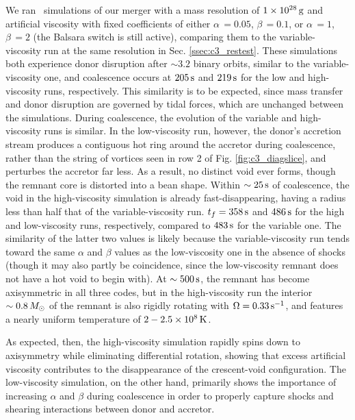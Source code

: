 We ran \gasoline\ simulations of our merger with a mass resolution of $1\times10^{28}\,\mathrm{g}$ and artificial viscosity with fixed coefficients of either $\alpha\,=0.05$, $\beta\,=0.1$, or $\alpha\,=1$, $\beta\,=2$ (the Balsara switch is still active), comparing them to the variable-viscosity run at the same resolution in Sec. \ref{ssec:c3_restest}.  These simulations both experience donor disruption after $\sim3.2$ binary orbits, similar to the variable-viscosity one, and coalescence occurs at $205\,\mathrm{s}$ and $219\,\mathrm{s}$ for the low and high-viscosity runs, respectively.  This similarity is to be expected, since mass transfer and donor disruption are governed by tidal forces, which are unchanged between the simulations.  During coalescence, the evolution of the variable and high-viscosity runs is similar.  In the low-viscosity run, however, the donor's accretion stream produces a contiguous hot ring around the accretor during coalescence, rather than the string of vortices seen in row 2 of Fig. \ref{fig:c3_diagslice}, and perturbes the accretor far less.  As a result, no distinct void ever forms, though the remnant core is distorted into a bean shape.  Within $\sim25\,\mathrm{s}$ of coalescence, the void in the high-viscosity simulation is already fast-disappearing, having a radius less than half that of the variable-viscosity run.  $t_f = 358\,\mathrm{s}$ and $486\,\mathrm{s}$ for the high and low-viscosity runs, respectively, compared to $483\,\mathrm{s}$ for the variable one.  The similarity of the latter two values is likely because the variable-viscosity run tends toward the same $\alpha$ and $\beta$ values as the low-viscosity one in the absence of shocks (though it may also partly be coincidence, since the low-viscosity remnant does not have a hot void to begin with).  At $\sim500\,\mathrm{s}$, the remnant has become axisymmetric in all three codes, but in the high-viscosity run the interior $\sim0.8\,\Msun$ of the remnant is also rigidly rotating with $\Omega = 0.33\,\mathrm{s}^{-1}$, and features a nearly uniform temperature of $2 - 2.5\times10^8\,\mathrm{K}$. 

As expected, then, the high-viscosity simulation rapidly spins down to axisymmetry while eliminating differential rotation, showing that excess artificial viscosity contributes to the disappearance of the crescent-void configuration.  The low-viscosity simulation, on the other hand, primarily shows the importance of increasing $\alpha$ and $\beta$ during coalescence in order to properly capture shocks and shearing interactions between donor and accretor.


